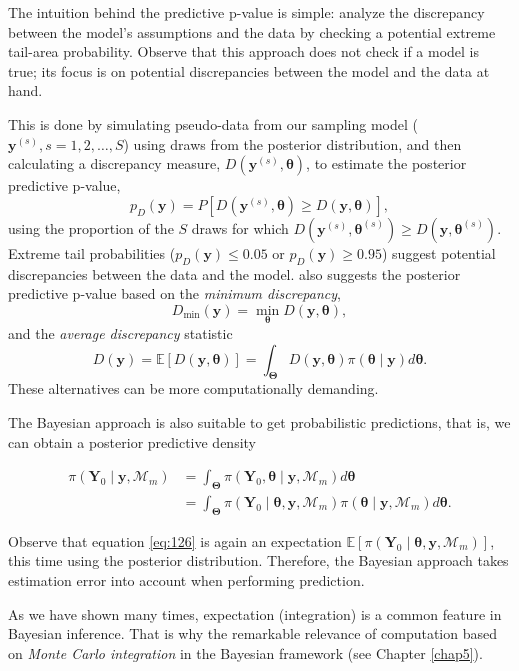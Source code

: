 The intuition behind the predictive p-value is simple: analyze the discrepancy between the model's assumptions and the data by checking a potential extreme tail-area probability. Observe that this approach does not check if a model is true; its focus is on potential discrepancies between the model and the data at hand.

This is done by simulating pseudo-data from our sampling model (\( \mathbf{y}^{(s)}, s=1,2,\dots,S \)) using draws from the posterior distribution, and then calculating a discrepancy measure, \( D(\mathbf{y}^{(s)},\bm{\theta}) \), to estimate the posterior predictive p-value,
\[
p_D(\mathbf{y}) = P[D(\mathbf{y}^{(s)},\bm{\theta}) \geq D(\mathbf{y},\bm{\theta})],
\]
using the proportion of the \( S \) draws for which \( D(\mathbf{y}^{(s)},\bm{\theta}^{(s)}) \geq D(\mathbf{y},\bm{\theta}^{(s)}) \). Extreme tail probabilities (\( p_D(\mathbf{y}) \leq 0.05 \) or \( p_D(\mathbf{y}) \geq 0.95 \)) suggest potential discrepancies between the data and the model. \cite{gelman1996posterior} also suggests the posterior predictive p-value based on the \textit{minimum discrepancy}, 
\[
D_{\min}(\mathbf{y}) = \min_{\bm{\theta}} D(\mathbf{y}, \bm{\theta}),
\]
and the \textit{average discrepancy} statistic 
\[
D(\mathbf{y}) = \mathbb{E}[D(\mathbf{y}, \bm{\theta})] = \int_{\mathbf{\Theta}} D(\mathbf{y}, \bm{\theta}) \pi(\bm{\theta} \mid \mathbf{y}) d\bm{\theta}.
\]
These alternatives can be more computationally demanding.

The Bayesian approach is also suitable to get probabilistic predictions, that is, we can obtain a posterior predictive density 

\begin{align}
	\pi(\mathbf{Y}_0\mid \mathbf{y},\mathcal{M}_m) & =\int_{\mathbf{\Theta}}\pi(\mathbf{Y}_0,\bm{\theta}\mid \mathbf{y},\mathcal{M}_m)d\bm{\theta}\nonumber\\
	&=\int_{\mathbf{\Theta}}\pi(\mathbf{Y}_0\mid \bm{\theta},\mathbf{y},\mathcal{M}_m)\pi(\bm{\theta}\mid \mathbf{y},\mathcal{M}_m)d\bm{\theta}.
	\label{eq:126}
\end{align}

Observe that equation \ref{eq:126} is again an expectation \( \mathbb{E}[\pi(\mathbf{Y}_0 \mid \bm{\theta}, \mathbf{y}, \mathcal{M}_m)] \), this time using the posterior distribution. Therefore, the Bayesian approach takes estimation error into account when performing prediction.

As we have shown many times, expectation (integration) is a common feature in Bayesian inference. That is why the remarkable relevance of computation based on \textit{Monte Carlo integration} in the Bayesian framework (see Chapter \ref{chap5}).

